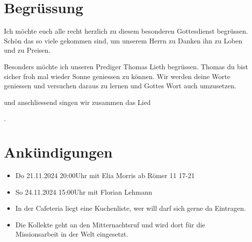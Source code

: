 
\section{Begrüssung}

Ich möchte euch alle recht herzlich zu diesem besonderen Gottesdienst begrüssen. Schön das so viele gekommen sind, um unserem Herrn zu Danken ihn zu Loben und zu Preisen.

Besonders möchte ich unseren Prediger Thomas Lieth begrüssen. Thomas du bist sicher froh mal wieder Sonne geniessen zu können. Wir werden deine Worte geniessen und versuchen daraus zu lernen und Gottes Wort auch umzusetzen.

\noindent
\beten{} und anschliessend singen wir zusammen das Lied

\noindent
{}.

\section{Ankündigungen}
\begin{itemize}
    \item {} Do 21.11.2024 20:00Uhr mit Elia Morris ab Römer 11 17-21
    \item {} So 24.11.2024 15:00Uhr mit Florian Lehmann
    \item {} In der Cafeteria liegt eine Kuchenliste, wer will darf sich gerne da Eintragen.
    \item {} Die Kollekte geht an den Mitternachtsruf und wird dort für die Missionsarbeit in der Welt eingesetzt.
\end{itemize}

